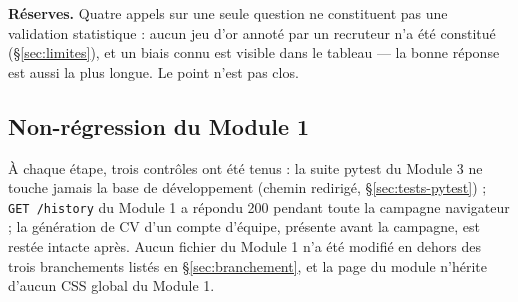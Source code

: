 \textbf{Réserves.} Quatre appels sur une seule question ne constituent pas une
validation statistique : aucun jeu d'or annoté par un recruteur n'a été constitué
(§\ref{sec:limites}), et un biais connu est visible dans le tableau ---
la bonne réponse est aussi la plus longue. Le point n'est pas clos.

\subsection{Non-régression du Module 1}
\label{sec:tests-m1}

À chaque étape, trois contrôles ont été tenus : la suite pytest du Module 3 ne
touche jamais la base de développement (chemin redirigé, §\ref{sec:tests-pytest}) ;
\texttt{GET /history} du Module 1 a répondu 200 pendant toute la campagne
navigateur ; la génération de CV d'un compte d'équipe, présente avant la campagne,
est restée intacte après. Aucun fichier du Module 1 n'a été modifié en dehors des
trois branchements listés en §\ref{sec:branchement}, et la page du module
n'hérite d'aucun CSS global du Module 1.
